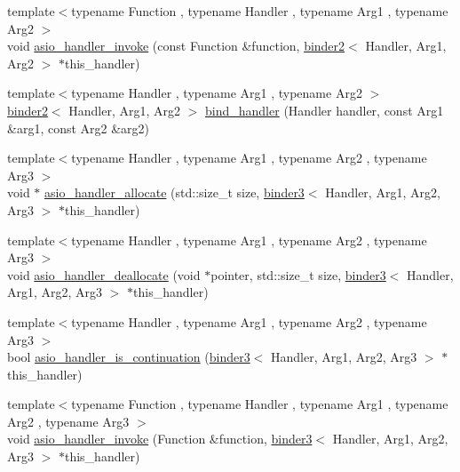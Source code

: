 \begin{DoxyCompactItemize}
\item 
{\footnotesize template$<$typename Function , typename Handler , typename Arg1 , typename Arg2 $>$ }\\void \hyperlink{namespaceasio_1_1detail_a9c5cbf292833ae69811426eb221681e8}{asio\+\_\+handler\+\_\+invoke} (const Function \&function, \hyperlink{classasio_1_1detail_1_1binder2}{binder2}$<$ Handler, Arg1, Arg2 $>$ $\ast$this\+\_\+handler)
\item 
{\footnotesize template$<$typename Handler , typename Arg1 , typename Arg2 $>$ }\\\hyperlink{classasio_1_1detail_1_1binder2}{binder2}$<$ Handler, Arg1, Arg2 $>$ \hyperlink{namespaceasio_1_1detail_a2e49a9acbb606e6d9ee1eca070c1f2c5}{bind\+\_\+handler} (Handler handler, const Arg1 \&arg1, const Arg2 \&arg2)
\item 
{\footnotesize template$<$typename Handler , typename Arg1 , typename Arg2 , typename Arg3 $>$ }\\void $\ast$ \hyperlink{namespaceasio_1_1detail_a885fa58367706674deab732fc6b80431}{asio\+\_\+handler\+\_\+allocate} (std\+::size\+\_\+t size, \hyperlink{classasio_1_1detail_1_1binder3}{binder3}$<$ Handler, Arg1, Arg2, Arg3 $>$ $\ast$this\+\_\+handler)
\item 
{\footnotesize template$<$typename Handler , typename Arg1 , typename Arg2 , typename Arg3 $>$ }\\void \hyperlink{namespaceasio_1_1detail_a2c5da6a0a2da54d211d3a58b84df48cd}{asio\+\_\+handler\+\_\+deallocate} (void $\ast$pointer, std\+::size\+\_\+t size, \hyperlink{classasio_1_1detail_1_1binder3}{binder3}$<$ Handler, Arg1, Arg2, Arg3 $>$ $\ast$this\+\_\+handler)
\item 
{\footnotesize template$<$typename Handler , typename Arg1 , typename Arg2 , typename Arg3 $>$ }\\bool \hyperlink{namespaceasio_1_1detail_a0c47271f7b56b3b52de92b2bbfff6ee6}{asio\+\_\+handler\+\_\+is\+\_\+continuation} (\hyperlink{classasio_1_1detail_1_1binder3}{binder3}$<$ Handler, Arg1, Arg2, Arg3 $>$ $\ast$this\+\_\+handler)
\item 
{\footnotesize template$<$typename Function , typename Handler , typename Arg1 , typename Arg2 , typename Arg3 $>$ }\\void \hyperlink{namespaceasio_1_1detail_ab3539571da0afc1a7ac47d6db2837572}{asio\+\_\+handler\+\_\+invoke} (Function \&function, \hyperlink{classasio_1_1detail_1_1binder3}{binder3}$<$ Handler, Arg1, Arg2, Arg3 $>$ $\ast$this\+\_\+handler)
\item 

\end{DoxyCompactItemize}
